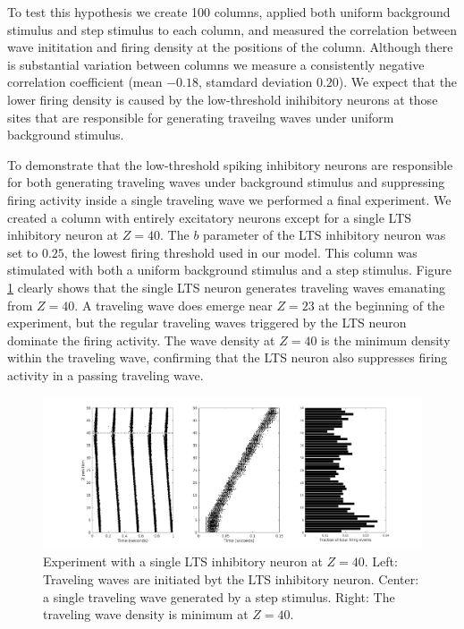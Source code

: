 \documentclass[a4paper,11pt]{article}
\begin{document}
To test this hypothesis we create 100 columns, applied both uniform background stimulus and step stimulus to each column, and measured the correlation between wave inititation and firing density at the positions of the column.
Although there is substantial variation between columns we measure a consistently negative correlation coefficient (mean $-0.18$, stamdard deviation $0.20$).
We expect that the lower firing density is caused by the low-threshold inihibitory neurons at those sites that are responsible for generating traveilng waves under uniform background stimulus.

To demonstrate that the low-threshold spiking inhibitory neurons are responsible for both generating traveling waves under background stimulus and suppressing firing activity inside a single traveling wave we performed a final experiment.
We created a column with entirely excitatory neurons except for a single LTS inhibitory neuron at $Z=40$.
The $b$ parameter of the LTS inhibitory neuron was set to $0.25$, the lowest firing threshold used in our model.
This column was stimulated with both a uniform background stimulus and a step stimulus. 
Figure \ref{fig:lts_inhibit} clearly shows that the single LTS neuron generates traveling waves emanating from $Z=40$. 
A traveling wave does emerge near $Z=23$ at the beginning of the experiment, but the regular traveling waves triggered by the LTS neuron dominate the firing activity.
The wave density at $Z=40$ is the minimum density within the traveling wave, confirming that the LTS neuron also suppresses firing activity in a passing traveling wave.
\begin{figure}[!htb]
 \caption{Experiment with a single LTS inhibitory neuron at $Z=40$. Left: Traveling waves are initiated byt the LTS inhibitory neuron. Center: a single traveling wave generated by a step stimulus. Right: The traveling wave density is minimum at $Z=40$.}
 \label{fig:lts_inhibit}
 \centering
   \includegraphics[width=\textwidth]{fig/SingleLTSInhibit}
\end{figure}
\end{document}
